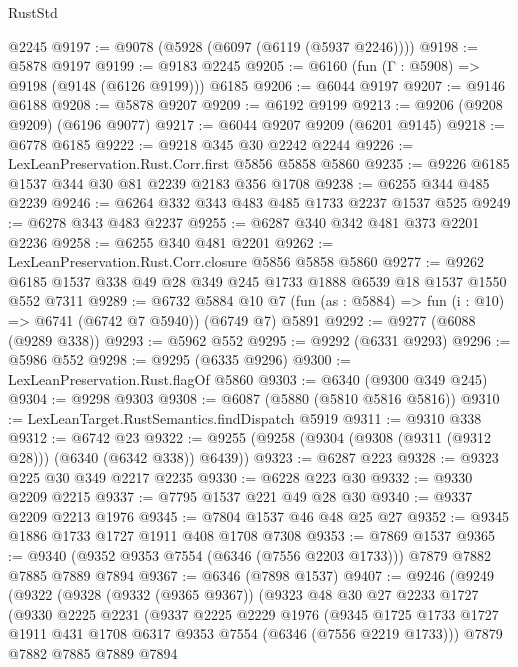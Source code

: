 \begin{lexlean}{RustStd}
\begin{coremodule}
    @2245
@9197 := @9078 (@5928 (@6097 (@6119 (@5937 @2246))))
@9198 := @5878 @9197
@9199 := @9183 @2245
@9205 := @6160 (fun (Γ : @5908) => @9198 (@9148 (@6126 @9199))) @6185
@9206 := @6044 @9197
@9207 := @9146 @6188
@9208 := @5878 @9207
@9209 := @6192 @9199
@9213 := @9206 (@9208 @9209) (@6196 @9077)
@9217 := @6044 @9207 @9209 (@6201 @9145)
@9218 := @6778 @6185
@9222 := @9218 @345 @30 @2242 @2244
@9226 := LexLeanPreservation.Rust.Corr.first @5856 @5858 @5860
@9235 := @9226 @6185 @1537 @344 @30 @81 @2239 @2183 @356 @1708
@9238 := @6255 @344 @485 @2239
@9246 := @6264 @332 @343 @483 @485 @1733 @2237 @1537 @525
@9249 := @6278 @343 @483 @2237
@9255 := @6287 @340 @342 @481 @373 @2201 @2236
@9258 := @6255 @340 @481 @2201
@9262 := LexLeanPreservation.Rust.Corr.closure @5856 @5858 @5860
@9277 := @9262 @6185 @1537 @338 @49 @28 @349 @245 @1733 @1888 @6539 @18 @1537 @1550 @552 @7311
@9289 := @6732
    @5884
    @10
    @7
    (fun (as : @5884) => fun (i : @10) => @6741 (@6742 @7 @5940))
    (@6749 @7)
    @5891
@9292 := @9277 (@6088 (@9289 @338))
@9293 := @5962 @552
@9295 := @9292 (@6331 @9293)
@9296 := @5986 @552
@9298 := @9295 (@6335 @9296)
@9300 := LexLeanPreservation.Rust.flagOf @5860
@9303 := @6340 (@9300 @349 @245)
@9304 := @9298 @9303
@9308 := @6087 (@5880 (@5810 @5816 @5816))
@9310 := LexLeanTarget.RustSemantics.findDispatch @5919
@9311 := @9310 @338
@9312 := @6742 @23
@9322 := @9255 (@9258 (@9304 (@9308 (@9311 (@9312 @28))) (@6340 (@6342 @338)) @6439))
@9323 := @6287 @223
@9328 := @9323 @225 @30 @349 @2217 @2235
@9330 := @6228 @223 @30
@9332 := @9330 @2209 @2215
@9337 := @7795 @1537 @221 @49 @28 @30
@9340 := @9337 @2209 @2213 @1976
@9345 := @7804 @1537 @46 @48 @25 @27
@9352 := @9345 @1886 @1733 @1727 @1911 @408 @1708 @7308
@9353 := @7869 @1537
@9365 := @9340 (@9352 @9353 @7554 (@6346 (@7556 @2203 @1733))) @7879 @7882 @7885 @7889 @7894
@9367 := @6346 (@7898 @1537)
@9407 := @9246
    (@9249
      (@9322
        (@9328
          (@9332 (@9365 @9367))
          (@9323
            @48
            @30
            @27
            @2233
            @1727
            (@9330
              @2225
              @2231
              (@9337
                @2225
                @2229
                @1976
                (@9345
                  @1725
                  @1733
                  @1727
                  @1911
                  @431
                  @1708
                  @6317
                  @9353
                  @7554
                  (@6346 (@7556 @2219 @1733)))
                @7879
                @7882
                @7885
                @7889
                @7894

\end{coremodule}
\end{lexlean}
